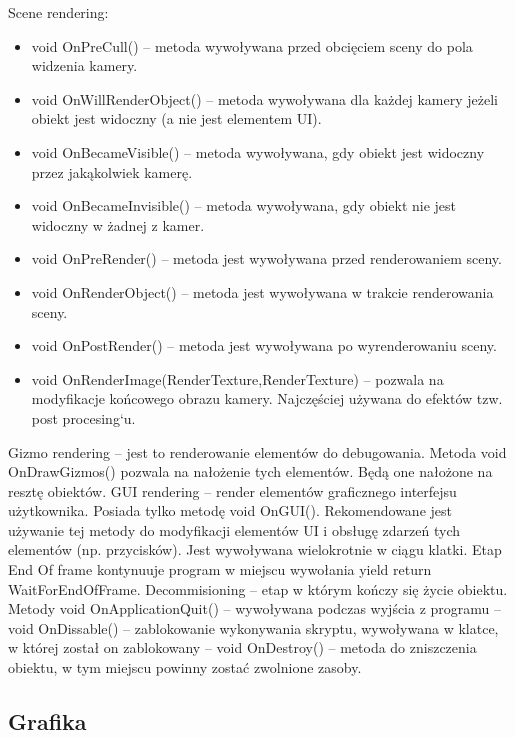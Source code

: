 \documentclass[12pt,twoside]{article}
\begin{document}
Scene rendering:
\begin{itemize}
    \item void OnPreCull() -- metoda wywoływana przed obcięciem sceny do pola
    widzenia kamery.
    \item void OnWillRenderObject() -- metoda wywoływana dla każdej kamery jeżeli
    obiekt jest widoczny (a nie jest elementem UI).
    \item void OnBecameVisible() -- metoda wywoływana, gdy obiekt jest widoczny
    przez jakąkolwiek kamerę.
    \item void OnBecameInvisible() -- metoda wywoływana, gdy obiekt nie jest
    widoczny w żadnej z kamer. 
    \item void OnPreRender() -- metoda jest wywoływana przed renderowaniem sceny.
    \item void OnRenderObject() -- metoda jest wywoływana w trakcie renderowania
    sceny.
    \item void OnPostRender() -- metoda jest wywoływana po wyrenderowaniu sceny.
    \item void OnRenderImage(RenderTexture,RenderTexture) -- pozwala na
    modyfikacje końcowego obrazu kamery. Najczęściej używana do efektów tzw.
    post procesing`u.
\end{itemize}
Gizmo rendering -- jest to renderowanie elementów do debugowania. Metoda void
OnDrawGizmos() pozwala na nałożenie tych elementów. Będą one nałożone na resztę
obiektów. GUI rendering -- render elementów graficznego interfejsu użytkownika.
Posiada tylko metodę  
void OnGUI().  Rekomendowane jest używanie tej metody do modyfikacji elementów
UI i obsługę zdarzeń tych elementów (np. przycisków). Jest wywoływana
wielokrotnie w ciągu klatki. Etap End Of frame kontynuuje program w miejscu
wywołania yield return WaitForEndOfFrame. Decommisioning -- etap w którym kończy
się życie obiektu. Metody void OnApplicationQuit() -- wywoływana podczas wyjścia
z programu --  void OnDissable() -- zablokowanie wykonywania skryptu, wywoływana w
klatce, w której został on zablokowany -- void OnDestroy() -- metoda do
zniszczenia obiektu, w tym miejscu powinny zostać zwolnione zasoby.

\subsection{Grafika}
\end{document}
